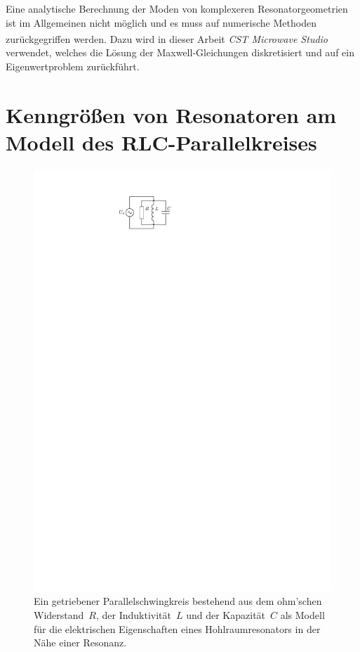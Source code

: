 Eine analytische Berechnung der Moden von komplexeren Resonatorgeometrien ist im Allgemeinen nicht möglich und es muss auf numerische Methoden zurückgegriffen werden.
Dazu wird in dieser Arbeit \emph{CST Microwave Studio\textsuperscript{\textregistered}} verwendet, welches die Lösung der Maxwell-Gleichungen diskretisiert und auf ein Eigenwertproblem zurückführt.


\section{Kenngrößen von Resonatoren am Modell des RLC-Parallelkreises}
\begin{figure}[h]
  \centering
  \includegraphics[scale=1.4]{./figs/RLC_circuit.pdf}
  \caption{Ein getriebener Parallelschwingkreis bestehend aus dem ohm'schen Widerstand~$R$, der Induktivität~$L$ und der Kapazität~$C$ als Modell für die elektrischen Eigenschaften eines Hohlraumresonators in der Nähe einer Resonanz.}
  \label{fig:rlc_circuit}
\end{figure}
